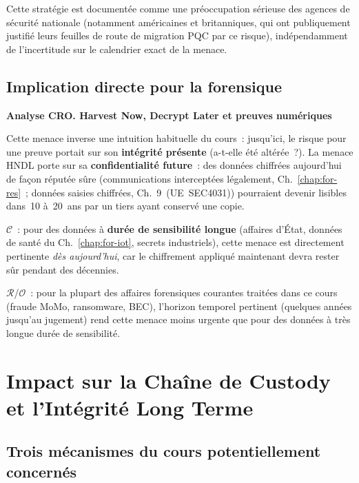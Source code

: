 Cette stratégie est documentée comme une préoccupation sérieuse
des agences de sécurité nationale (notamment américaines et
britanniques, qui ont publiquement justifié leurs feuilles de
route de migration PQC par ce risque), indépendamment de
l'incertitude sur le calendrier exact de la menace.

\subsection{Implication directe pour la forensique}

\begin{boxCRO}
\textbf{Analyse CRO. Harvest Now, Decrypt Later et preuves numériques}

Cette menace inverse une intuition habituelle du cours~: jusqu'ici,
le risque pour une preuve portait sur son \textbf{intégrité présente}
(a-t-elle été altérée~?). La menace HNDL porte sur sa
\textbf{confidentialité future}~: des données chiffrées aujourd'hui
de façon réputée sûre (communications interceptées légalement,
Ch.~\ref{chap:for-res}~; données saisies chiffrées, Ch.~9~(UE~SEC4031))
pourraient devenir lisibles dans~10 à~20~ans par un tiers ayant
conservé une copie.

$\mathcal{C}$~: pour des données à \textbf{durée de sensibilité
longue} (affaires d'État, données de santé du Ch.~\ref{chap:for-iot},
secrets industriels), cette menace est directement pertinente
\emph{dès aujourd'hui}, car le chiffrement appliqué maintenant
devra rester sûr pendant des décennies.

$\mathcal{R}$/$\mathcal{O}$~: pour la plupart des affaires
forensiques courantes traitées dans ce cours (fraude MoMo,
ransomware, BEC), l'horizon temporel pertinent
(quelques années jusqu'au jugement) rend cette menace moins
urgente que pour des données à très longue durée de sensibilité.

\end{boxCRO}

\section{Impact sur la Chaîne de Custody et l'Intégrité Long Terme}
\label{sec:impact-custody}

\subsection{Trois mécanismes du cours potentiellement concernés}


